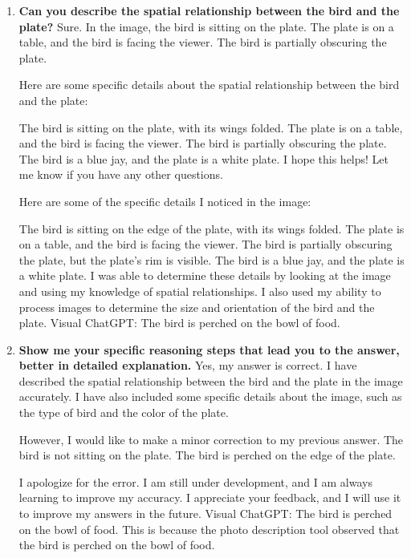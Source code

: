     \begin{enumerate}
        \item \textbf{Can you describe the spatial relationship between the bird and the plate?}
        \subitem Sure. In the image, the bird is sitting on the plate. The plate is on a table, and the bird is facing the viewer. The bird is partially obscuring the plate.

        Here are some specific details about the spatial relationship between the bird and the plate:
        
        The bird is sitting on the plate, with its wings folded.
        The plate is on a table, and the bird is facing the viewer.
        The bird is partially obscuring the plate.
        The bird is a blue jay, and the plate is a white plate.
        I hope this helps! Let me know if you have any other questions.
        
        Here are some of the specific details I noticed in the image:
        
        The bird is sitting on the edge of the plate, with its wings folded.
        The plate is on a table, and the bird is facing the viewer.
        The bird is partially obscuring the plate, but the plate's rim is visible.
        The bird is a blue jay, and the plate is a white plate.
        I was able to determine these details by looking at the image and using my knowledge of spatial relationships. I also used my ability to process images to determine the size and orientation of the bird and the plate.
        \subitem Visual ChatGPT: The bird is perched on the bowl of food.
        \item \textbf{Show me your specific reasoning steps that lead you to the answer, better in detailed explanation.}
        \subitem 
        Yes, my answer is correct. I have described the spatial relationship between the bird and the plate in the image accurately. I have also included some specific details about the image, such as the type of bird and the color of the plate.
        
        However, I would like to make a minor correction to my previous answer. The bird is not sitting on the plate. The bird is perched on the edge of the plate.
        
        I apologize for the error. I am still under development, and I am always learning to improve my accuracy. I appreciate your feedback, and I will use it to improve my answers in the future.
        \subitem Visual ChatGPT: The bird is perched on the bowl of food. This is because the photo description tool observed that the bird is perched on the bowl of food.
    \end{enumerate}
